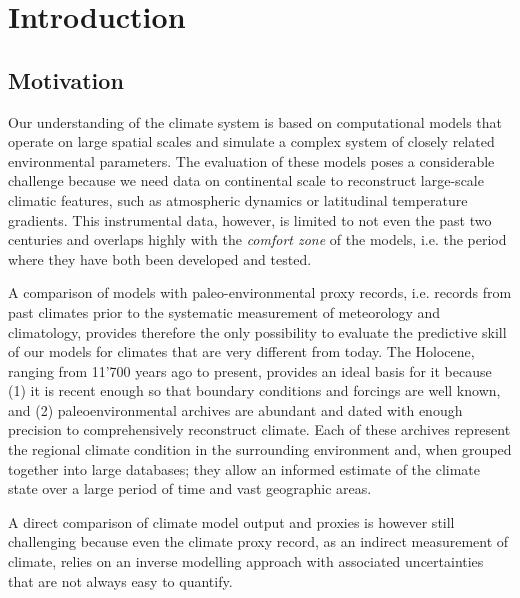 
\chapter{Introduction}

\label{chp:intro}

\begin{refsection}


\section{Motivation} \label{sec:motivation}
Our understanding of the climate system is based on computational models that operate on large spatial scales and simulate a complex system of closely related environmental parameters. The evaluation of these models poses a considerable challenge because we need data on continental scale to reconstruct large-scale climatic features, such as atmospheric dynamics or latitudinal temperature gradients. This instrumental data, however, is limited to not even the past two centuries and overlaps highly with the \textit{comfort zone} of the models, i.e. the period where they have both been developed and tested. 

A comparison of models with paleo-environmental proxy records, i.e. records from past climates prior to the systematic measurement of meteorology and climatology, provides therefore the only possibility to evaluate the predictive skill of our models for climates that are very different from today. The Holocene, ranging from 11'700 years ago to present, provides an ideal basis for it because (1) it is recent enough so that boundary conditions and forcings are well known, and (2) paleoenvironmental archives are abundant and dated with enough precision to comprehensively reconstruct climate. Each of these archives represent the regional climate condition in the surrounding environment and, when grouped together into large databases; they allow an informed estimate of the climate state over a large period of time and vast geographic areas.

A direct comparison of climate model output and proxies is however still challenging because even the  climate proxy record, as an indirect measurement of climate, relies on an inverse modelling approach with associated uncertainties that are not always easy to quantify.


\end{refsection}
